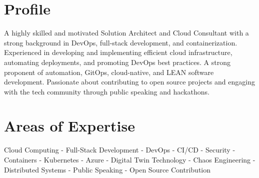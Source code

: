 


\section{Profile}
{A highly skilled and motivated Solution Architect and Cloud Consultant with a strong background in DevOps, full-stack development, and containerization. Experienced in developing and implementing efficient cloud infrastructure, automating deployments, and promoting DevOps best practices. A strong proponent of automation, GitOps, cloud-native, and LEAN software development. Passionate about contributing to open source projects and engaging with the tech community through public speaking and hackathons.}

\section{Areas of Expertise}
{Cloud Computing - Full-Stack Development - DevOps - CI/CD - Security - Containers - Kubernetes - Azure -  Digital Twin Technology - Chaos Engineering - Distributed Systems - Public Speaking - Open Source Contribution}

